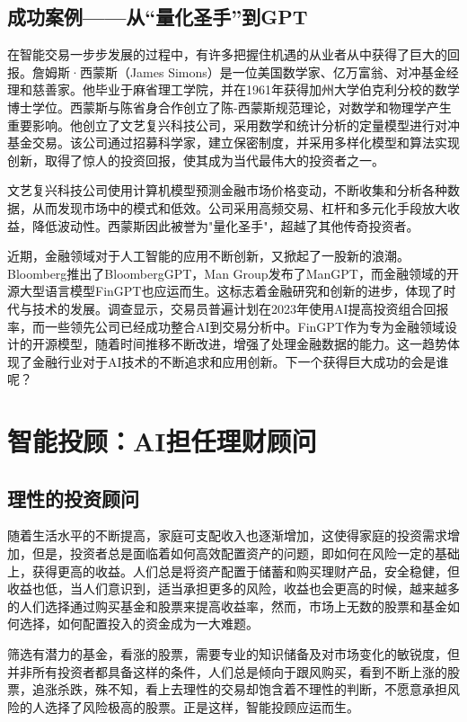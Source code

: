 \subsection{ 成功案例——从“量化圣手”到GPT}
在智能交易一步步发展的过程中，有许多把握住机遇的从业者从中获得了巨大的回报。詹姆斯·西蒙斯（James Simons）是一位美国数学家、亿万富翁、对冲基金经理和慈善家。他毕业于麻省理工学院，并在1961年获得加州大学伯克利分校的数学博士学位。西蒙斯与陈省身合作创立了陈-西蒙斯规范理论，对数学和物理学产生重要影响。他创立了文艺复兴科技公司，采用数学和统计分析的定量模型进行对冲基金交易。该公司通过招募科学家，建立保密制度，并采用多样化模型和算法实现创新，取得了惊人的投资回报，使其成为当代最伟大的投资者之一。

文艺复兴科技公司使用计算机模型预测金融市场价格变动，不断收集和分析各种数据，从而发现市场中的模式和低效。公司采用高频交易、杠杆和多元化手段放大收益，降低波动性。西蒙斯因此被誉为"量化圣手"，超越了其他传奇投资者。

近期，金融领域对于人工智能的应用不断创新，又掀起了一股新的浪潮。Bloomberg推出了BloombergGPT，Man Group发布了ManGPT，而金融领域的开源大型语言模型FinGPT也应运而生。这标志着金融研究和创新的进步，体现了时代与技术的发展。调查显示，交易员普遍计划在2023年使用AI提高投资组合回报率，而一些领先公司已经成功整合AI到交易分析中。FinGPT作为专为金融领域设计的开源模型，随着时间推移不断改进，增强了处理金融数据的能力。这一趋势体现了金融行业对于AI技术的不断追求和应用创新。下一个获得巨大成功的会是谁呢？

\section{智能投顾：AI担任理财顾问}
\subsection{理性的投资顾问}

随着生活水平的不断提高，家庭可支配收入也逐渐增加，这使得家庭的投资需求增加，但是，投资者总是面临着如何高效配置资产的问题，即如何在风险一定的基础上，获得更高的收益。人们总是将资产配置于储蓄和购买理财产品，安全稳健，但收益也低，当人们意识到，适当承担更多的风险，收益也会更高的时候，越来越多的人们选择通过购买基金和股票来提高收益率，然而，市场上无数的股票和基金如何选择，如何配置投入的资金成为一大难题。

筛选有潜力的基金，看涨的股票，需要专业的知识储备及对市场变化的敏锐度，但并非所有投资者都具备这样的条件，人们总是倾向于跟风购买，看到不断上涨的股票，追涨杀跌，殊不知，看上去理性的交易却饱含着不理性的判断，不愿意承担风险的人选择了风险极高的股票。正是这样，智能投顾应运而生。

